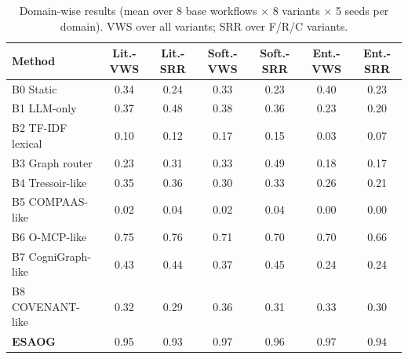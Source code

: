 \begin{table}[H]
\centering
\caption{Domain-wise results (mean over 8 base workflows $\times$ 8 variants $\times$ 5 seeds per domain). VWS over all variants; SRR over F/R/C variants.}
\label{tab:domainresults}
\scriptsize
\begin{tabular}{lcccccc}
\toprule
Method & Lit.-VWS & Lit.-SRR & Soft.-VWS & Soft.-SRR & Ent.-VWS & Ent.-SRR\\
\midrule
B0 Static & 0.34 & 0.24 & 0.33 & 0.23 & 0.40 & 0.23\\
B1 LLM-only & 0.37 & 0.48 & 0.38 & 0.36 & 0.23 & 0.20\\
B2 TF-IDF lexical & 0.10 & 0.12 & 0.17 & 0.15 & 0.03 & 0.07\\
B3 Graph router & 0.23 & 0.31 & 0.33 & 0.49 & 0.18 & 0.17\\
B4 Tressoir-like & 0.35 & 0.36 & 0.30 & 0.33 & 0.26 & 0.21\\
B5 COMPAAS-like & 0.02 & 0.04 & 0.02 & 0.04 & 0.00 & 0.00\\
B6 O-MCP-like & 0.75 & 0.76 & 0.71 & 0.70 & 0.70 & 0.66\\
B7 CogniGraph-like & 0.43 & 0.44 & 0.37 & 0.45 & 0.24 & 0.24\\
B8 COVENANT-like & 0.32 & 0.29 & 0.36 & 0.31 & 0.33 & 0.30\\
\textbf{ESAOG} & 0.95 & 0.93 & 0.97 & 0.96 & 0.97 & 0.94\\
\bottomrule
\end{tabular}
\end{table}
